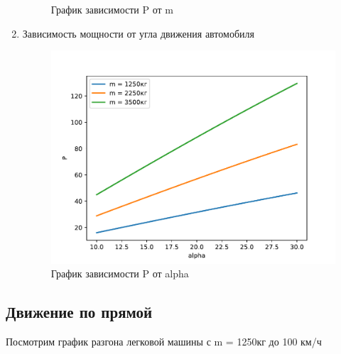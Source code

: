 \documentclass[a4paper, 14pt]{extarticle}
\begin{document}
\begin{enumerate}
\begin{figure}[H]
						\caption[.] {График зависимости P от m}
					\end{figure}
				\item Зависимость мощности от угла движения автомобиля
				\begin{figure}[H]
					\centering
					\includegraphics[width = \linewidth]{fig4.pdf}
					\caption[.] {График зависимости P от alpha}
				\end{figure}
			\end{enumerate}
		\pagebreak
		\subsection{Движение по прямой}
			Посмотрим график разгона легковой машины с m = 1250кг до 100 км/ч 
			
\end{document}
